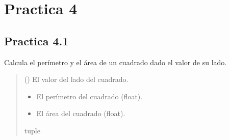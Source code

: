 \documentclass[letterpaper,10pt,spanish]{sphinxmanual}
\begin{document}
\sphinxstepscope


\chapter{Practica 4}
\label{\detokenize{pr4:practica-4}}\label{\detokenize{pr4::doc}}

\section{Practica 4.1}
\label{\detokenize{pr4:module-pr4.1}}\label{\detokenize{pr4:practica-4-1}}

\begin{fulllineitems}
\label{\detokenize{pr4:pr4.1.calcular_perimetro_area_cuadrado}}
\pysigstartsignatures
{}
\pysigstopsignatures
\sphinxAtStartPar
Calcula el perímetro y el área de un cuadrado dado el valor de su lado.
\begin{quote}\begin{description}
\sphinxAtStartPar
{} () \textendash{} El valor del lado del cuadrado.

\sphinxAtStartPar
\begin{description}
\begin{itemize}
\item {} 
\sphinxAtStartPar
El perímetro del cuadrado (float).

\item {} 
\sphinxAtStartPar
El área del cuadrado (float).

\end{itemize}

\end{description}


\sphinxAtStartPar
tuple

\end{description}\end{quote}

\end{fulllineitems}
\end{document}
